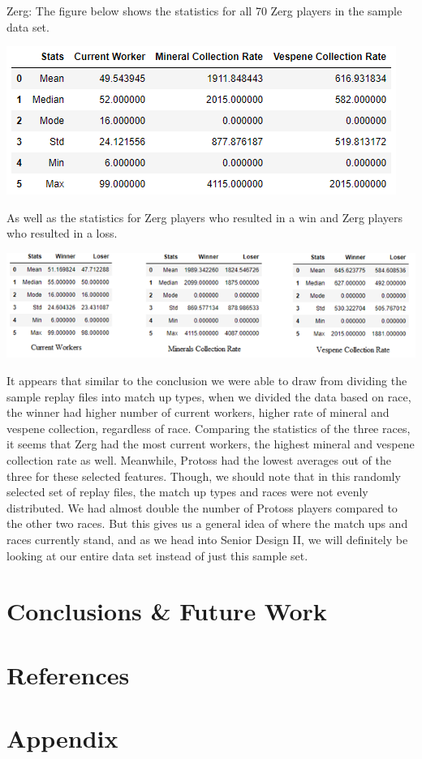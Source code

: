 \documentclass[a4paper,12pt]{report}
\begin{document}
Zerg:
The figure below shows the statistics for all 70 Zerg players in the sample data set. 

\begin{center}
    \captionsetup{type=figure}
    \includegraphics[width=.9\linewidth]{media/ZergDescriptive.png}
\end{center}

As well as the statistics for Zerg players who resulted in a win and Zerg players who resulted in a loss. 

\begin{center}
    \captionsetup{type=figure}
    \includegraphics[width=.9\linewidth]{media/ZergWinnervsLoser.png}
\end{center}

It appears that similar to the conclusion we were able to draw from dividing the sample replay files into match up types, when we divided the data based on race, the winner had higher number of current workers, higher rate of mineral and vespene collection, regardless of race. Comparing the statistics of the three races, it seems that Zerg had the most current workers, the highest mineral and vespene collection rate as well. Meanwhile, Protoss had the lowest averages out of the three for these selected features. Though, we should note that in this randomly selected set of replay files, the match up types and races were not evenly distributed. We had almost double the number of Protoss players compared to the other two races. But this gives us a general idea of where the match ups and races currently stand, and as we head into Senior Design II, we will definitely be looking at our entire data set instead of just this sample set.

\chapter{Conclusions \& Future Work}
\chapter{References}
\chapter{Appendix}
\end{document}
